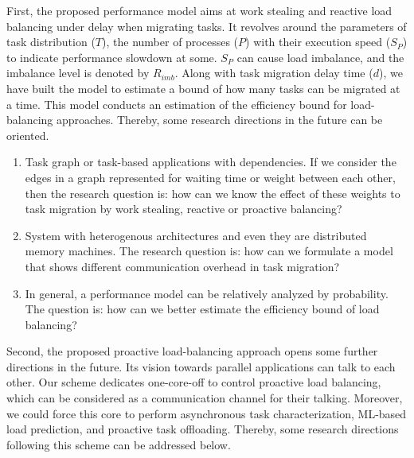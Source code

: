 First, the proposed performance model aims at work stealing and reactive load balancing under delay when migrating tasks. It revolves around the parameters of task distribution ($T$), the number of processes ($P$) with their execution speed ($S_{P}$) to indicate performance slowdown at some. $S_{P}$ can cause load imbalance, and the imbalance level is denoted by $R_{imb}$. Along with task migration delay time ($d$), we have built the model to estimate a bound of how many tasks can be migrated at a time. This model conducts an estimation of the efficiency bound for load-balancing approaches. Thereby, some research directions in the future can be oriented.

\begin{enumerate}[label=(\arabic*)]
	\item Task graph or task-based applications with dependencies. If we consider the edges in a graph represented for waiting time or weight between each other, then the research question is: how can we know the effect of these weights to task migration by work stealing, reactive or proactive balancing?
	\item System with heterogenous architectures and even they are distributed memory machines. The research question is: how can we formulate a model that shows different communication overhead in task migration?
	\item In general, a performance model can be relatively analyzed by probability. The question is: how can we better estimate the efficiency bound of load balancing?
\end{enumerate}

Second, the proposed proactive load-balancing approach opens some further directions in the future. Its vision towards parallel applications can talk to each other. Our scheme dedicates one-core-off to control proactive load balancing, which can be considered as a communication channel for their talking. Moreover, we could force this core to perform asynchronous task characterization, ML-based load prediction, and proactive task offloading. Thereby, some research directions following this scheme can be addressed below.

